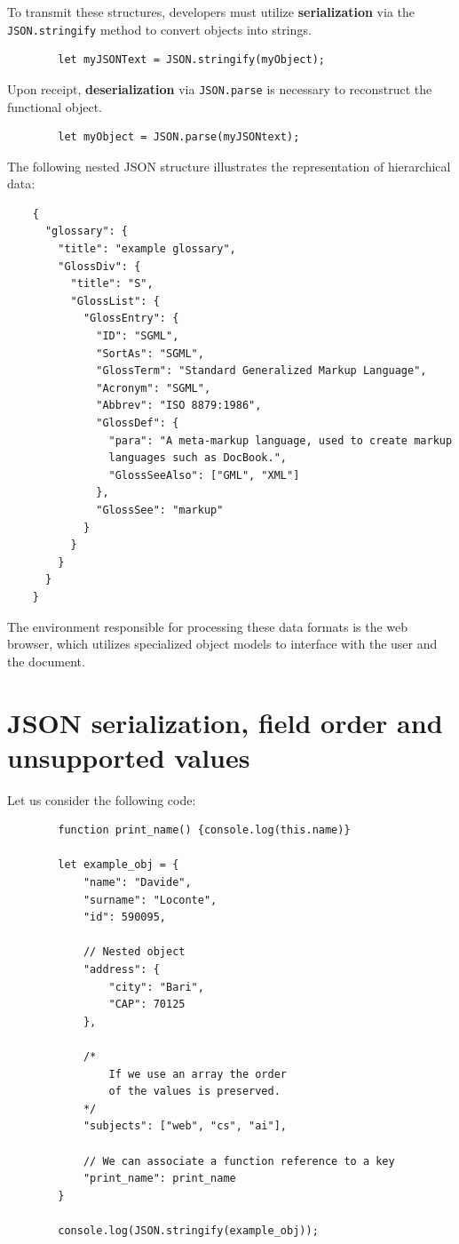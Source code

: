 \documentclass{scrbook}
\begin{document}
	To transmit these structures, developers must utilize \textbf{serialization} via the \texttt{JSON.stringify} method to convert objects into strings.
	
	\begin{lstlisting}
		let myJSONText = JSON.stringify(myObject);
	\end{lstlisting}
	
	Upon receipt, \textbf{deserialization} via \texttt{JSON.parse} is necessary to reconstruct the functional object.
	
	\begin{lstlisting}
		let myObject = JSON.parse(myJSONtext);
	\end{lstlisting}
	
	The following nested JSON structure illustrates the representation of hierarchical data:
	
	\begin{lstlisting}
	{
	  "glossary": {
	    "title": "example glossary",
	    "GlossDiv": {
	      "title": "S",
	      "GlossList": {
	        "GlossEntry": {
	          "ID": "SGML",
	          "SortAs": "SGML",
	          "GlossTerm": "Standard Generalized Markup Language",
	          "Acronym": "SGML",
	          "Abbrev": "ISO 8879:1986",
	          "GlossDef": {
	            "para": "A meta-markup language, used to create markup
	            languages such as DocBook.",
	            "GlossSeeAlso": ["GML", "XML"]
	          },
	          "GlossSee": "markup"
	        }
	      }
	    }
	  }
	}
	\end{lstlisting}
	
	The environment responsible for processing these data formats is the web browser, which utilizes specialized object models to interface with the user and the document.
	
	\section{JSON serialization, field order and unsupported values}
	
	Let us consider the following code:
	
	\begin{lstlisting}
		function print_name() {console.log(this.name)}
		
		let example_obj = {
			"name": "Davide",
			"surname": "Loconte",
			"id": 590095,
			
			// Nested object
			"address": {
				"city": "Bari",
				"CAP": 70125
			},
			
			/*
				If we use an array the order
				of the values is preserved.
			*/
			"subjects": ["web", "cs", "ai"],
			
			// We can associate a function reference to a key
			"print_name": print_name
		}
		
		console.log(JSON.stringify(example_obj));
	\end{lstlisting}
	
\end{document}
